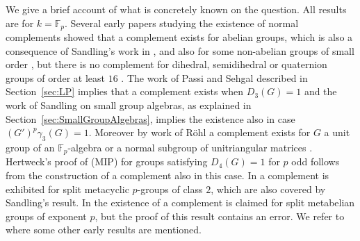 \documentclass[11pt, a4paper]{amsart}
\theoremstyle{definition}
\begin{document}
We give a brief account of what is concretely known on the question. All results are for $k = \mathbb{F}_p$.
Several early papers studying the existence of normal complements showed that a complement exists for abelian groups, which is also a consequence of Sandling's work in \cite{Sandling84}, and also for some non-abelian groups of small order \cite{MoranTench77, Johnson78, Ivory80}, but there is no complement for dihedral, semidihedral or quaternion groups of order at least $16$ \cite{Ivory80}. The work of Passi and Sehgal described in Section~\ref{sec:LP} implies that a complement exists when $D_3(G) = 1$ and the work of Sandling on small group algebras, as explained in Section~\ref{sec:SmallGroupAlgebras}, implies the existence also in case $(G')^p\gamma_3(G) = 1$. Moreover by work of R\"ohl a complement exists for $G$ a unit group of an $\mathbb{F}_p$-algebra or a normal subgroup of unitriangular matrices \cite{Roehl91}. Hertweck's proof of (MIP) for groups satisfying $D_4(G)=1$ for $p$ odd follows from the construction of a complement also in this case. In \cite{KaurKhan19} a complement is exhibited for split metacyclic $p$-groups of class $2$, which are also covered by Sandling's result. In \cite{KaurKhan20} the existence of a complement is claimed for split metabelian groups of exponent $p$, but the proof of this result contains an error. We refer to \cite{Sandling89} where some other early results are mentioned.
\end{document}

